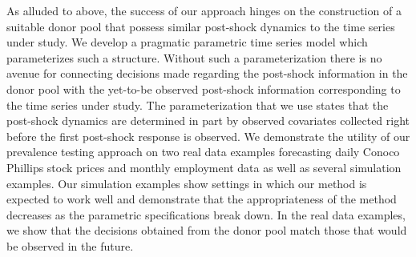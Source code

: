 \documentclass[11pt]{article}
\theoremstyle{definition}
\begin{document}
As alluded to above, the success of our approach hinges on the construction of a suitable donor pool that possess similar post-shock dynamics to the time series under study. We develop a pragmatic parametric time series model which parameterizes such a structure. Without such a parameterization there is no avenue for connecting decisions made regarding the post-shock information in the donor pool with the yet-to-be observed post-shock information corresponding to the time series under study. The parameterization that we use states that the post-shock dynamics are determined in part by observed covariates collected right before the first post-shock response is observed. %
We demonstrate the utility of our prevalence testing approach on two real data examples forecasting daily Conoco Phillips stock prices and monthly employment data as well as several simulation examples. Our simulation examples show settings in which our method is expected to work well and demonstrate that the appropriateness of the method decreases as the parametric specifications break down. In the real data examples, we show that the decisions obtained from the donor pool match those that would be observed in the future.




\end{document}
